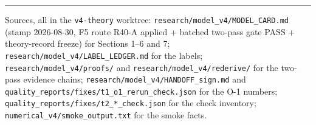 \documentclass[11pt,a4paper]{article}
\begin{document}
\vspace{4pt}
\noindent\rule{\textwidth}{0.4pt}

\vspace{2pt}
\noindent\footnotesize\raggedright
Sources, all in the \texttt{v4-theory} worktree:
\texttt{research/model\_v4/MODEL\_CARD.md} (stamp 2026-08-30, F5 route R40-A applied +
batched two-pass gate PASS + theory-record freeze) for Sections 1--6 and 7;
\texttt{research/model\_v4/LABEL\_LEDGER.md} for the labels;
\texttt{research/model\_v4/proofs/} and \texttt{research/model\_v4/rederive/} for the
two-pass evidence chains;
\texttt{research/model\_v4/HANDOFF\_sign.md} and
\texttt{quality\_reports/fixes/t1\_o1\_rerun\_check.json} for the O-1 numbers;
\texttt{quality\_reports/fixes/t2\_*\_check.json} for the check inventory;
\texttt{numerical\_v4/smoke\_output.txt} for the smoke facts.
\end{document}
